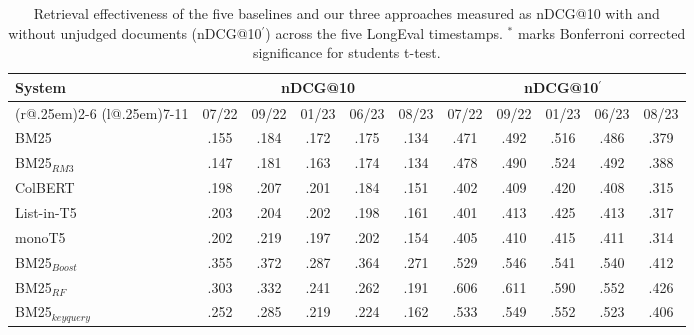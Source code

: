 \begin{table}[t]
\small
\centering
\renewcommand{\tabcolsep}{3.2pt}
\caption{Retrieval effectiveness of the five baselines and our three approaches measured as nDCG@10 with and without unjudged documents (nDCG@10$^{'}$) across the five LongEval timestamps. {\color{red} $^{*}$ marks Bonferroni corrected significance for students t-test.}}
\label{tab:table-results}

\begin{tabular}{@{}l@{}cccccccccc@{}}
    \toprule
    \bfseries System & \multicolumn{5}{c}{\bfseries nDCG@10} & \multicolumn{5}{c}{\bfseries nDCG@10$^{'}$}\\
    \cmidrule(r@{.25em}){2-6}
    \cmidrule(l@{.25em}){7-11}
    
    & 07/22 & 09/22 & 01/23 & 06/23 & 08/23 & 07/22 & 09/22 & 01/23 & 06/23 & 08/23\\
    
    \midrule

    BM25 & .155 & .184 & .172 & .175 & .134 & .471 & .492 & .516 & .486 & .379 \\
    BM25$_{RM3}$ & .147 & .181 & .163 & .174 & .134 & .478 & .490 & .524 & .492 & .388 \\
    ColBERT & .198 & .207 & .201 & .184 & .151 & .402 & .409 & .420 & .408 & .315 \\
    List-in-T5 & .203 & .204 & .202 & .198 & .161 & .401 & .413 & .425 & .413 & .317 \\
    monoT5 & .202 & .219 & .197 & .202 & .154 & .405 & .410 & .415 & .411 & .314 \\
    
    \midrule
    
    BM25$_{Boost}$ & .355 & .372 & .287 & .364 & .271 & .529 & .546 & .541 & .540 & .412 \\
    BM25$_{RF}$ & .303 & .332 & .241 & .262 & .191 & .606 & .611 & .590 & .552 & .426 \\
    BM25$_{keyquery}$ & .252 & .285 & .219 & .224 & .162 & .533 & .549 & .552 & .523 & .406 \\

\bottomrule
\end{tabular}
\end{table}
